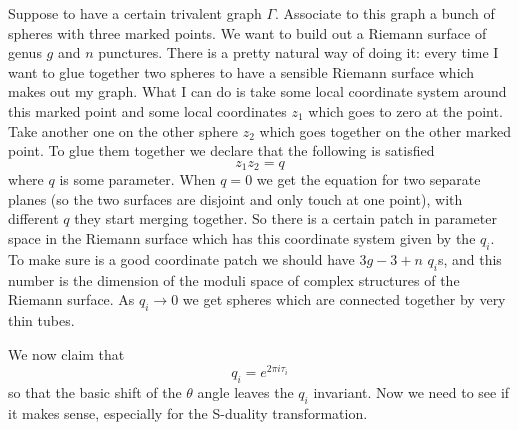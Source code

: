 \documentclass[11pt]{article}
\theoremstyle{definition}
\numberwithin{equation}{section}
\begin{document}
Suppose to have a certain trivalent graph $\Gamma$. Associate to this graph a bunch of spheres with three marked points. We want to build out a Riemann surface of genus $g$ and $n$ punctures. There is a pretty natural way of doing it: every time I want to glue together two spheres to have a sensible Riemann surface which makes out my graph. What I can do is take some local coordinate system around this marked point and some local coordinates $z_{1}$ which goes to zero at the point. Take another one on the other sphere $z_{2}$ which goes together on the other marked point. To glue them together we declare that the following is satisfied
\begin{equation}
	z_{1}z_{2}=q
\end{equation}
where $q$ is some parameter. When $q=0$ we get the equation for two separate planes (so the two surfaces are disjoint and only touch at one point), with different $q$ they start merging together. So there is a certain patch in parameter space in the Riemann surface which has this coordinate system given by the $q_{i}$. To make sure is a good coordinate patch we should have $3g-3+n$ $q_{i}$s, and this number is the dimension of the moduli space of complex structures of the Riemann surface. As $q_{i}\rightarrow 0$ we get spheres which are connected together by very thin tubes.

We now claim that 
\begin{equation}
	q_{i}=e^{2\pi i\tau_{i}}
\end{equation}
so that the basic shift of the $\theta$ angle leaves the $q_{i}$ invariant. Now we need to see if it makes sense, especially for the S-duality transformation.
\end{document}
